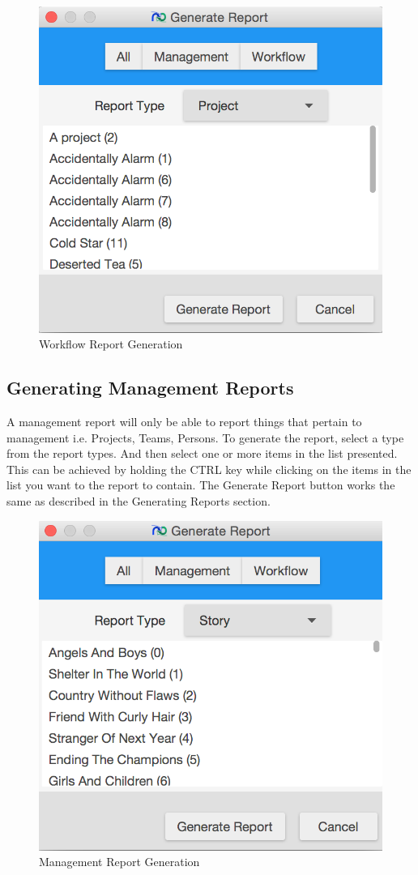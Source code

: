 \begin{figure}[H]
\centering
\includegraphics[width=\textwidth]{images/screenshots/report2.PNG}
\caption{Workflow Report Generation}
\label{fig:generate_report_workflow}
\end{figure}

\subsection{Generating Management Reports}

A management report will only be able to report things that pertain to management i.e. Projects, Teams, Persons. To generate the report, select a type from the report types. And then select one or more items in the list presented. This can be achieved by holding the CTRL key while clicking on the items in the list you want to the report to contain. The Generate Report button works the same as described in the Generating Reports section.

\begin{figure}[H]
\centering
\includegraphics[width=\textwidth]{images/screenshots/report3.PNG}
\caption{Management Report Generation}
\label{fig:generate_report_management}
\end{figure}
